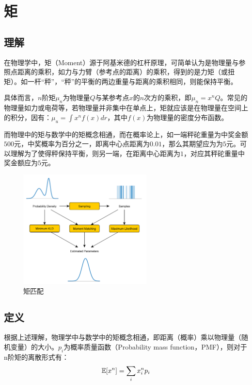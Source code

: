 \documentclass[11pt]{article}
\begin{document}
\section{矩}

\subsection{理解}

在物理学中，矩（Moment）源于阿基米德的杠杆原理，可简单认为是物理量与参照点距离的乘积，如力与力臂（参考点的距离）的乘积，得到的是力矩（或扭矩）。如一杆“秤”，“秤”的平衡的两边重量与距离的乘积相同，则能保持平衡。

具体而言，$n$阶矩$\mu_n$为物理量$Q$与某参考点$x$的$n$次方的乘积，即$\mu_n = x^n Q$。常见的物理量如力或电荷等，若物理量并非集中在单点上，矩就应该是在物理量在空间上的积分，因有：$\mu_u = \int x^n f(x) dr$，其中$f(x)$为物理量的密度分布函数。

而物理中的矩与数学中的矩概念相通，而在概率论上，如一端秤砣重量为中奖金额$500$元，中奖概率为百分之一，即离中心点距离为$0.01$，那么其期望应为为$5$元。可以理解为了使得秤保持平衡，则另一端，在距离中心距离为$1$，对应其秤砣重量中奖金额应为$5$元。

\begin{figure}[ht!]
    \centering
    \includegraphics[width=0.6\textwidth]{fig/moment-matching.png}
    \caption{矩匹配}
    \label{fig:moment-match}
\end{figure}

\subsection{定义}

根据上述理解，物理学中与数学中的矩概念相通，即距离（概率）乘以物理量（随机变量）的大小。$p_i$为概率质量函数（Probability mass function，PMF），则对于n阶矩的离散形式有：
\begin{equation*}
    \mathbb{E}[x^n] = \sum_i x_i^n p_i
\end{equation*}
\end{document}
